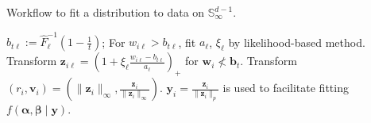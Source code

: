 %     
\begin{algorithm}[htb]
    \caption{Workflow to fit a distribution to data 
        on $\mathbb{S}_{\infty}^{d-1}$.}\label{alg:workflow}
    \begin{algorithmic}[1]
        \State $b_{t\ell} := \hat{F}_{\ell}^{-1}\left(1 - \frac{1}{t}\right)$; 
            For $w_{i\ell} > b_{t\ell}$, fit $a_{\ell}$, $\xi_{\ell}$ 
            by likelihood-based method.
        \State Transform 
            $\bm{z}_{i\ell} = \left(1 + \xi_{\ell}\frac{w_{i\ell} 
                - b_{t\ell}}{a_{\ell}}\right)_+$ for $\bm{w}_i\not< \bm{b}_t$.
        \State Transform $(r_i,\bm{v}_i) = \left(\lVert \bm{z}_i\rVert_\infty, 
            \frac{\bm{z}_i}{\lVert \bm{z}_i\rVert_{\infty}}\right)$.
        \State $\bm{y}_i = \frac{\bm{z}_i}{\lVert \bm{z}_i\rVert_p}$ is used to facilitate fitting $f(\bm{\alpha}, \bm{\beta}\mid\bm{y})$.
    \end{algorithmic}
\end{algorithm}

